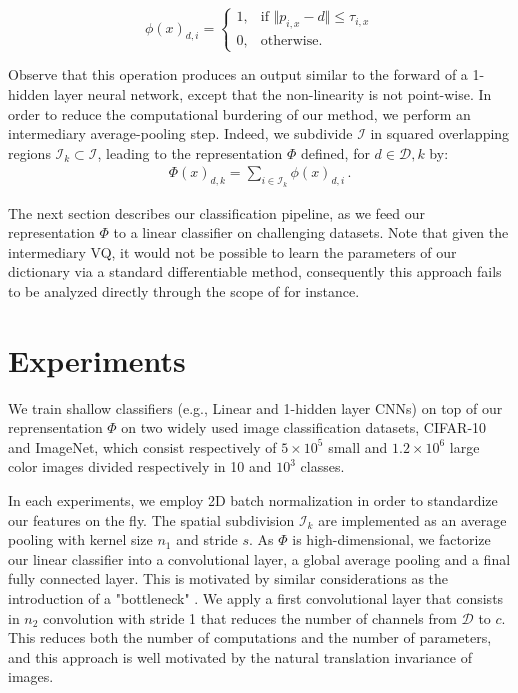 \documentclass{article}
\begin{document}
{\begin{equation}
\phi(x)_{d,i}=
\begin{cases}
1,&\text{if } \Vert  p_{i,x} - d\Vert \leq \tau_{i,x}\\
0,&\text{otherwise}.
\end{cases}
\end{equation}






Observe that this operation produces an output similar to the forward of a 1-hidden layer neural network, except that the non-linearity is not point-wise. In order to reduce the computational burdering of our method, we perform an intermediary average-pooling step.
Indeed, we subdivide $\mathcal{I}$ in squared overlapping regions $\mathcal{I}_k\subset\mathcal{I}$, leading to the representation $\Phi$ defined, for $d\in\mathcal{D}, k$ by:
\begin{align*}\Phi(x)_{d,k}= \sum_{i\in \mathcal{I}_k}\phi(x)_{d,i}\,.\end{align*}

The next section describes our classification pipeline, as we feed our representation $\Phi$ to a linear classifier on challenging datasets. Note that given the intermediary VQ, it would not be possible to learn the parameters of our dictionary via a standard differentiable method, consequently this approach fails to be analyzed directly through the scope of \cite{chizat2018global} for instance.




\section{Experiments}
\label{experiments}
We train  shallow classifiers (e.g., Linear and 1-hidden layer CNNs) on top of our reprensentation $\Phi$ on two widely used image classification datasets,  CIFAR-10 and ImageNet, which consist respectively of $5\times10^5$ small and $1.2\times10^6$ large color images  divided respectively in 10 and $10^3$ classes.


In each experiments, we employ 2D batch normalization in order to standardize our features on the fly. The spatial subdivision $\mathcal{I}_k$ are implemented as an average pooling with kernel size $n_1$ and stride $s$. 
As  $\Phi$ is high-dimensional, we factorize our linear classifier into a convolutional layer, a global average pooling and a final fully connected layer. This is motivated by similar considerations as the introduction of a "bottleneck" \cite{ResNet}. We apply a first convolutional layer that consists in $n_2$ convolution with stride 1 that reduces the number of channels from $\mathcal{D}$ to $c$. This reduces both the number of computations and the number of parameters, and this approach is well motivated by the natural translation invariance of images.

}
\end{document}
